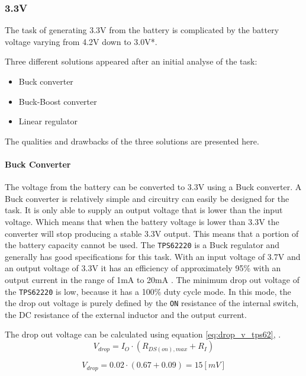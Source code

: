 \subsubsection*{3.3V}
The task of generating 3.3V from the battery is complicated by the battery voltage varying from 4.2V down to 3.0V*.

Three different solutions appeared after an initial analyse of the task:

\begin{itemize}
	\item Buck converter
	\item Buck-Boost converter
	\item Linear regulator
\end{itemize}

The qualities and drawbacks of the three solutions are presented here.

\paragraph{Buck Converter}
The voltage from the battery can be converted to 3.3V using a Buck converter.
A Buck converter is relatively simple and circuitry can easily be designed for the task.
It is only able to supply an output voltage that is lower than the input voltage.
Which means that when the battery voltage is lower than 3.3V the converter will stop producing a stable 3.3V output.
This means that a portion of the battery capacity cannot be used.
The \texttt{TPS62220} is a Buck regulator and generally has good specifications for this task. 
With an input voltage of 3.7V and an output voltage of 3.3V it has an efficiency of approximately 95\% with an output current in the range of 1mA to 20mA \cite{TPS6222}.
The minimum drop out voltage of the \texttt{TPS62220} is low, because it has a 100\% duty cycle mode.
In this mode, the the drop out voltage is purely defined by the \texttt{ON} resistance of the internal switch, the DC resistance of the external inductor and the output current.

The drop out voltage can be calculated using equation \ref{eq:drop_v_tps62}, \cite{TPS6222}.
\begin{equation}
	V_{drop} = I_{O} \cdot (R_{DS(on),max}+R_I)
	\label{eq:drop_v_tps62}
\end{equation}

\begin{equation}
	V_{drop} = 0.02 \cdot (0.67+0.09) = 15 [mV]
	\label{eq:drop_v_tps62_2}
\end{equation}

